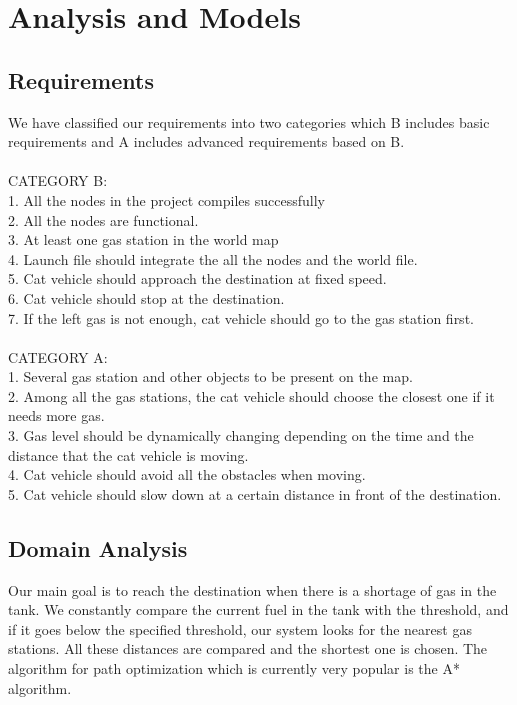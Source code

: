 \documentclass[12pt,onecolumn,titlepage]{article}
\begin{document}
\section{Analysis and Models}
\subsection{Requirements}
We have classified our requirements into two categories which B includes basic requirements and A includes advanced requirements based on B.\\
\\
CATEGORY B:\\
1.	All the nodes in the project compiles successfully\\
2.	All the nodes are functional.\\
3.	At least one gas station in the world map \\
4.	Launch file should integrate the all the nodes and the world file.\\
5.	Cat vehicle should approach the destination at fixed speed.\\
6.	Cat vehicle should stop at the destination.\\
7.	If the left gas is not enough, cat vehicle should go to the gas station first.\\
\\
CATEGORY A:\\
1.	Several gas station and other objects to be present on the map.\\
2.	Among all the gas stations, the cat vehicle should choose the closest one if it needs more gas.\\
3.	Gas level should be dynamically changing depending on the time and the distance that the cat vehicle is moving.\\
4.	Cat vehicle should avoid all the obstacles when moving.\\
5.	Cat vehicle should slow down at a certain distance in front of the destination.\\

\subsection{Domain Analysis}
Our main goal is to reach the destination when there is a shortage of gas in the tank. We constantly compare the current fuel in the tank with the threshold, and if it goes below the specified threshold, our system looks for the nearest gas stations. All these distances are compared and the shortest one is chosen. The algorithm for path optimization which is currently very popular is the A* algorithm.
\end{document}
